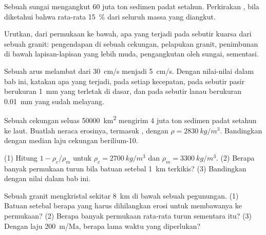 \begin{exercise}[$\star$]\label{exo:g12:destruction-of-mountains:4}
Sebuah sungai mengangkut 60 juta ton sedimen padat setahun. Perkirakan , bila diketahui bahwa  rata-rata
\qty{15}{\percent} dari seluruh massa yang diangkut.
\end{exercise}

\begin{exercise}[$\star$]\label{exo:g12:destruction-of-mountains:5}
Urutkan, dari permukaan ke bawah, apa yang terjadi pada sebutir kuarsa dari
sebuah granit: pengendapan di sebuah cekungan, pelapukan granit, penimbunan di
bawah lapisan-lapisan yang lebih muda, pengangkutan oleh sungai, sementasi.
\end{exercise}

\begin{exercise}[$\star\star$]\label{exo:g12:destruction-of-mountains:6}
Sebuah arus melambat dari \qty{30}{cm/s} menjadi \qty{5}{cm/s}. Dengan
nilai-nilai dalam bab ini, katakan apa yang terjadi, pada setiap kecepatan, pada
sebutir pasir berukuran \qty{1}{mm} yang terletak di dasar, dan pada sebutir
lanau berukuran \qty{0.01}{mm} yang sudah melayang.
\end{exercise}

\begin{exercise}[$\star\star$]\label{exo:g12:destruction-of-mountains:7}
Sebuah cekungan seluas \qty{50000}{km^2} mengirim 4 juta ton sedimen padat
setahun ke laut. Buatlah neraca erosinya, termasuk , dengan $\rho =
\qty{2830}{kg/m^3}$. Bandingkan dengan median laju cekungan berilium-10.
\end{exercise}

\begin{exercise}[$\star\star$]\label{exo:g12:destruction-of-mountains:8}
(1) Hitung $1 - \rho_c/\rho_m$ untuk $\rho_c = \qty{2700}{kg/m^3}$ dan
$\rho_m = \qty{3300}{kg/m^3}$. (2) Berapa banyak permukaan turun bila batuan
setebal \qty{1}{km} terkikis? (3) Bandingkan dengan nilai dalam bab ini.
\end{exercise}

\begin{exercise}[$\star\star$]\label{exo:g12:destruction-of-mountains:9}
Sebuah granit mengkristal sekitar \qty{8}{km} di bawah sebuah pegunungan.
(1) Batuan setebal berapa yang harus dihilangkan erosi untuk membawanya ke
permukaan? (2) Berapa banyak permukaan rata-rata turun sementara itu?
(3) Dengan laju \qty{200}{m/Ma}, berapa lama waktu yang diperlukan?
\end{exercise}

